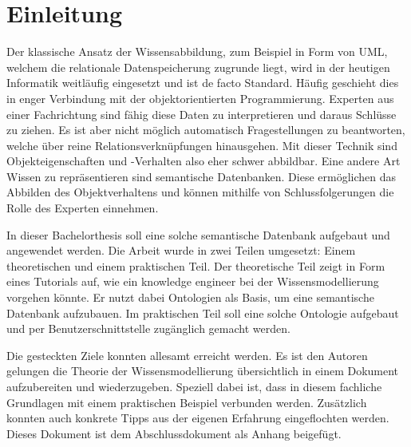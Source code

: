 \chapter{Einleitung}
\label{chap:einleitung}


Der klassische Ansatz der Wissensabbildung, zum Beispiel in Form von UML, welchem die relationale Datenspeicherung zugrunde liegt, wird in der heutigen Informatik weitläufig eingesetzt und ist de facto Standard. Häufig geschieht dies in enger Verbindung mit der objektorientierten Programmierung. Experten aus einer Fachrichtung sind fähig diese Daten zu interpretieren und daraus Schlüsse zu ziehen. Es ist aber nicht möglich automatisch Fragestellungen zu beantworten, welche über reine Relationsverknüpfungen hinausgehen. Mit dieser Technik sind Objekteigenschaften und -Verhalten also eher schwer abbildbar. Eine andere Art Wissen zu repräsentieren sind semantische Datenbanken. Diese ermöglichen das Abbilden des Objektverhaltens und können mithilfe von Schlussfolgerungen die Rolle des Experten einnehmen.

In dieser Bachelorthesis soll eine solche semantische Datenbank aufgebaut und angewendet werden.  Die Arbeit wurde in zwei Teilen umgesetzt: Einem  theoretischen und einem praktischen Teil. Der theoretische Teil zeigt in Form eines Tutorials auf, wie ein knowledge engineer bei der Wissensmodellierung vorgehen könnte. Er nutzt dabei Ontologien als Basis, um eine semantische Datenbank aufzubauen. Im praktischen Teil soll eine solche Ontologie aufgebaut und per Benutzerschnittstelle zugänglich gemacht werden.

Die gesteckten Ziele konnten allesamt erreicht werden. Es ist den Autoren gelungen die Theorie der Wissensmodellierung übersichtlich in einem Dokument aufzubereiten und wiederzugeben. Speziell dabei ist, dass in diesem fachliche Grundlagen mit einem praktischen Beispiel verbunden werden. Zusätzlich konnten auch konkrete Tipps aus der eigenen Erfahrung eingeflochten werden. Dieses Dokument ist dem Abschlussdokument als Anhang beigefügt.

